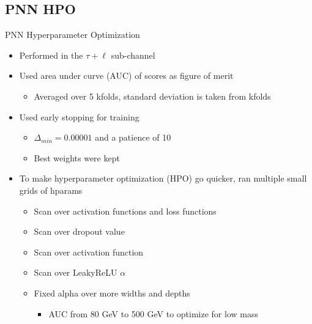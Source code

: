 \documentclass[aspectratio=169,xcolor=table]{beamer}
\begin{document}
  \subsection{ PNN HPO }

    \begin{frame}[t]{PNN Hyperparameter Optimization}
      \begin{itemize}
        \item Performed in the $\tau+\ell$ sub-channel
        \item Used area under curve (AUC) of scores as figure of merit
        \begin{itemize}
          \item Averaged over 5 kfolds, standard deviation is taken from kfolds
        \end{itemize}
          \item Used early stopping for training
          \begin{itemize}
            \item $\Delta_{min}=0.00001$ and a patience of 10
            \item Best weights were kept
          \end{itemize}
        \item To make hyperparameter optimization (HPO) go quicker, ran multiple small grids of hparams
        \begin{itemize}
          \item Scan over activation functions and loss functions
          \item Scan over dropout value
          \item Scan over activation function
          \item Scan over LeakyReLU $\alpha$
          \item Fixed alpha over more widths and depths
          \begin{itemize}
            \item AUC from 80 GeV to 500 GeV to optimize for low mass
          \end{itemize}
        \end{itemize}
      \end{itemize}
    \end{frame}
\end{document}
